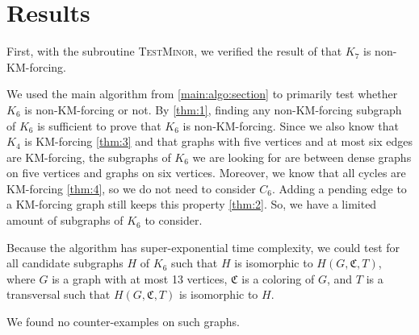 \section{Results}
 
First, with the subroutine \textsc{TestMinor}, we verified the result of \cite{matthias_2022} that $K_7$ is non-KM-forcing.

We used the main algorithm from \ref{main:algo:section} to primarily test whether $K_6$ is non-KM-forcing or not.  
By \ref{thm:1}, finding any non-KM-forcing subgraph of $K_6$ is sufficient to prove that $K_6$ is non-KM-forcing.  
Since we also know that $K_4$ is KM-forcing \ref{thm:3} and that graphs with five vertices and at most six edges are KM-forcing,  
the subgraphs of $K_6$ we are looking for are between dense graphs on five vertices and graphs on six vertices.  
Moreover, we know that all cycles are KM-forcing \ref{thm:4}, so we do not need to consider $C_6$.  
Adding a pending edge to a KM-forcing graph still keeps this property \ref{thm:2}.  
So, we have a limited amount of subgraphs of $K_6$ to consider.

Because the algorithm has super-exponential time complexity, we could test for all candidate subgraphs $H$ of $K_6$ such that 
$H$ is isomorphic to $H(G, \mathfrak{C}, T)$, where $G$ is a graph with at most 13 vertices, $\mathfrak{C}$ is a coloring of $G$, and $T$ is a transversal such that $H(G,\mathfrak{C}, T)$ is isomorphic to $H$.

We found no counter-examples on such graphs.

